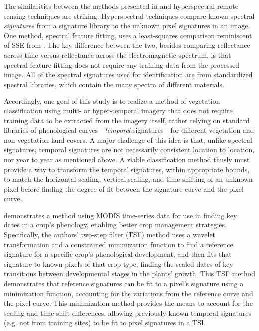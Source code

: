 The similarities between the methods presented in \citeauthor{brown2007multitemporal} and hyperspectral remote sensing techniques are striking. Hyperspectral techniques compare known spectral \textit{signatures} from a signature library to the unknown pixel signatures in an image. One method, spectral feature fitting, uses a least-squares comparison reminiscent of SSE from \citeauthor{brown2007multitemporal} \autocites{solutions2013selected}{clark2003imaging}. The key difference between the two, besides comparing reflectance across time versus reflectance across the electromagnetic spectrum, is that spectral feature fitting does not require any training data from the processed image. All of the spectral signatures used for identification are from standardized spectral libraries, which contain the many spectra of different materials.

Accordingly, one goal of this study is to realize a method of vegetation classification using multi- or hyper-temporal imagery that does not require training data to be extracted from the imagery itself, rather relying on standard libraries of phenological curves---\textit{temporal} signatures---for different vegetation and non-vegetation land covers. A major challenge of this idea is that, unlike spectral signatures, temporal signatures are not necessarily consistent location to location, nor year to year as mentioned above. A viable classification method thusly must provide a way to transform the temporal signatures, within appropriate bounds, to match the horizontal scaling, vertical scaling, and time shifting of an unknown pixel before finding the degree of fit between the signature curve and the pixel curve.

\textcites{sakamoto2005a-crop}{sakamoto2010a-two-step} demonstrates a method using MODIS time-series data for use in finding key dates in a crop’s phenology, enabling better crop management strategies. Specifically, the authors’ two-step filter (TSF) method uses a wavelet transformation and a constrained minimization function to find a reference signature for a specific crop’s phenological development, and then fits that signature to known pixels of that crop type, finding the scaled dates of key transitions between developmental stages in the plants’ growth. This TSF method demonstrates that reference signatures can be fit to a pixel’s signature using a minimization function, accounting for the variations from the reference curve and the pixel curve.  This minimization method provides the means to account for the scaling and time shift differences, allowing previously-known temporal signatures (e.g. not from training sites) to be fit to pixel signatures in a TSI.

